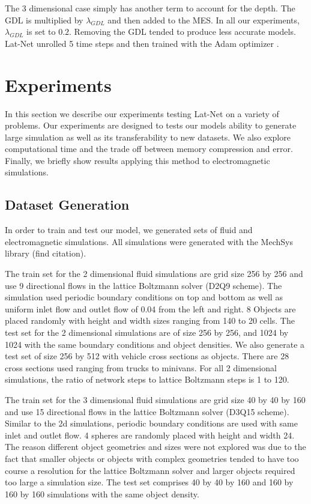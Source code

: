 \documentclass{article}
\begin{document}
The 3 dimensional case simply has another term to account for the depth. The GDL is multiplied by $\lambda_{GDL}$ and then added to the MES. In all our experiments, $\lambda_{GDL}$ is set to $0.2$. Removing the GDL tended to produce less accurate models. Lat-Net unrolled 5 time steps and then trained with the Adam optimizer \cite{kingma2014adam}.

\section{Experiments}

In this section we describe our experiments testing Lat-Net on a variety of problems. Our experiments are designed to tests our models ability to generate large simulation as well as its transferability to new datasets. We also explore computational time and the trade off between memory compression and error. Finally, we briefly show results applying this method to electromagnetic simulations.

\subsection{Dataset Generation}
In order to train and test our model, we generated sets of fluid and electromagnetic simulations. All simulations were generated with the MechSys library (find citation).

The train set for the 2 dimensional fluid simulations are grid size 256 by 256 and use 9 directional flows in the lattice Boltzmann solver (D2Q9 scheme)\cite{guo2013lattice}. The simulation used periodic boundary conditions on top and bottom as well as uniform inlet flow and outlet flow of 0.04 from the left and right. 8 Objects are placed randomly with height and width sizes ranging from 140 to 20 cells. The test set for the 2 dimensional simulations are of size 256 by 256, and 1024 by 1024 with the same boundary conditions and object densities. We also generate a test set of size 256 by 512 with vehicle cross sections as objects. There are 28 cross sections used ranging from trucks to minivans. For all 2 dimensional simulations, the ratio of network steps to lattice Boltzmann steps is 1 to 120.

The train set for the 3 dimensional fluid simulations are grid size 40 by 40 by 160 and use 15 directional flows in the lattice Boltzmann solver (D3Q15 scheme)\cite{guo2013lattice}. Similar to the 2d simulations, periodic boundary conditions are used with same inlet and outlet flow. 4 spheres are randomly placed with height and width 24. The reason different object geometries and sizes were not explored was due to the fact that smaller objects or objects with complex geometries tended to have too course a resolution for the lattice Boltzmann solver and larger objects required too large a simulation size. The test set comprises 40 by 40 by 160 and 160 by 160 by 160 simulations with the same object density.
\end{document}
